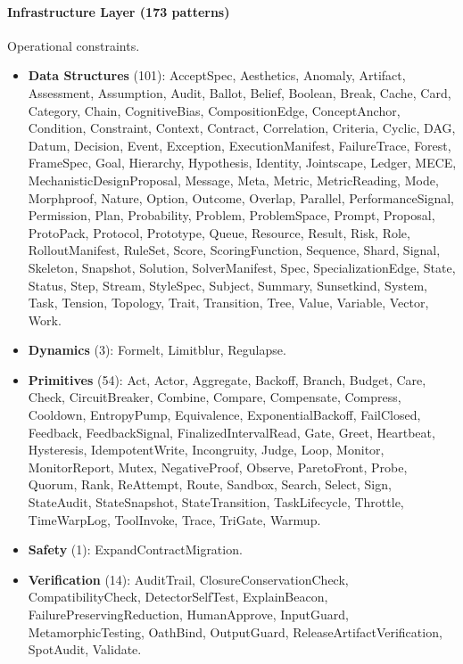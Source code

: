 \paragraph{Infrastructure Layer (173 patterns)} Operational constraints.
\begin{itemize}
    \item \textbf{Data Structures} (101): AcceptSpec, Aesthetics, Anomaly, Artifact, Assessment, Assumption, Audit, Ballot, Belief, Boolean, Break, Cache, Card, Category, Chain, CognitiveBias, CompositionEdge, ConceptAnchor, Condition, Constraint, Context, Contract, Correlation, Criteria, Cyclic, DAG, Datum, Decision, Event, Exception, ExecutionManifest, FailureTrace, Forest, FrameSpec, Goal, Hierarchy, Hypothesis, Identity, Jointscape, Ledger, MECE, MechanisticDesignProposal, Message, Meta, Metric, MetricReading, Mode, Morphproof, Nature, Option, Outcome, Overlap, Parallel, PerformanceSignal, Permission, Plan, Probability, Problem, ProblemSpace, Prompt, Proposal, ProtoPack, Protocol, Prototype, Queue, Resource, Result, Risk, Role, RolloutManifest, RuleSet, Score, ScoringFunction, Sequence, Shard, Signal, Skeleton, Snapshot, Solution, SolverManifest, Spec, SpecializationEdge, State, Status, Step, Stream, StyleSpec, Subject, Summary, Sunsetkind, System, Task, Tension, Topology, Trait, Transition, Tree, Value, Variable, Vector, Work.
    \item \textbf{Dynamics} (3): Formelt, Limitblur, Regulapse.
    \item \textbf{Primitives} (54): Act, Actor, Aggregate, Backoff, Branch, Budget, Care, Check, CircuitBreaker, Combine, Compare, Compensate, Compress, Cooldown, EntropyPump, Equivalence, ExponentialBackoff, FailClosed, Feedback, FeedbackSignal, FinalizedIntervalRead, Gate, Greet, Heartbeat, Hysteresis, IdempotentWrite, Incongruity, Judge, Loop, Monitor, MonitorReport, Mutex, NegativeProof, Observe, ParetoFront, Probe, Quorum, Rank, ReAttempt, Route, Sandbox, Search, Select, Sign, StateAudit, StateSnapshot, StateTransition, TaskLifecycle, Throttle, TimeWarpLog, ToolInvoke, Trace, TriGate, Warmup.
    \item \textbf{Safety} (1): ExpandContractMigration.
    \item \textbf{Verification} (14): AuditTrail, ClosureConservationCheck, CompatibilityCheck, DetectorSelfTest, ExplainBeacon, FailurePreservingReduction, HumanApprove, InputGuard, MetamorphicTesting, OathBind, OutputGuard, ReleaseArtifactVerification, SpotAudit, Validate.
\end{itemize}

